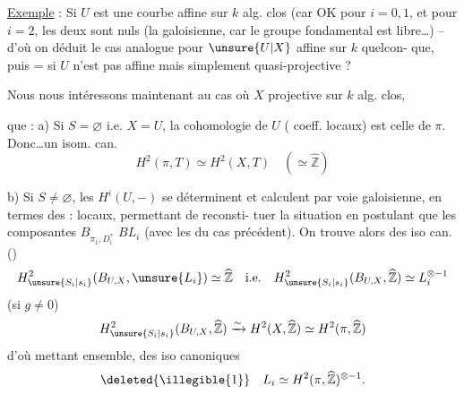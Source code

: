 \uline{Exemple} : Si $U$ est une courbe affine
sur $k$ alg. clos  (car OK pour $i=0,1$, et
pour $i=2$, les deux  sont nuls
(la  galoisienne, car le groupe fondamental
 est  libre\ldots) -- d'où on déduit le
cas analogue pour $\unsure{U|X}$ affine sur $k$ quelcon-
que, puis = si $U$ n'est pas affine mais
simplement quasi-projective ? 

Nous nous intéressons maintenant au
cas où $X$ projective  sur $k$ alg. clos, 

que : 
a) Si $S=\varnothing$ i.e. $X=U$, la cohomologie de $U$
 ( coeff. locaux) est celle
de $\pi$. Donc\ldots un isom. can.
\[
H^2(\pi,T)\simeq H^2(X,T)\quad(\simeq\widehat{\mathbb Z})
\]

b) Si $S\ne\varnothing$, les $H^i(U,-)$ se déterminent
et calculent par voie galoisienne, en termes
des   : locaux, permettant de reconsti-
tuer la situation
en postulant que les composantes $B_{\pi_1,D_i^{*}}$
 $BL_i$ (avec les
 du cas précédent). On
trouve alors des iso can. ()
\[
H^2_{\unsure{S_i|s_i}}(B_{U,X},\unsure{L_i})\simeq\widehat{\mathbb Z}
\quad\text{i.e.}\quad
H^2_{\unsure{S_i|s_i}}(B_{U,X},\widehat{\mathbb Z})\simeq L_i^{\otimes-1}
\]
(si $g\ne0$)
\[
H^2_{\unsure{S_i|s_i}}(B_{U,X},\widehat{\mathbb Z})
\xrightarrow{\sim}H^2(X,\widehat{\mathbb Z})
\simeq H^2(\pi,\widehat{\mathbb Z})
\]
d'où   mettant ensemble, des iso
canoniques
\[
\deleted{\illegible{1}}\quad L_i\simeq H^2(\pi,\widehat{\mathbb Z})^{\otimes-1}.
\]
